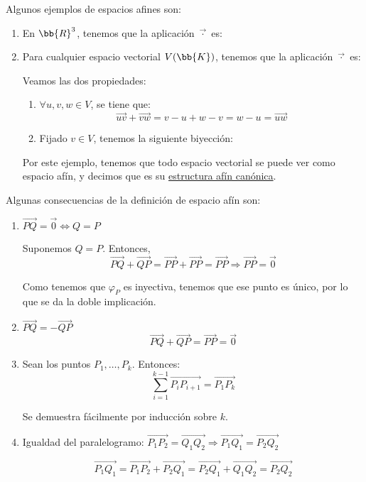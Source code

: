 \begin{ejemplo}
    Algunos ejemplos de espacios afines son:
    \begin{enumerate}
        \item En $\bb{R}^3$, tenemos que la aplicación $\vec{\cdot}$ es:

        \item Para cualquier espacio vectorial $V(\bb{K})$, tenemos que la aplicación $\vec{\cdot}$ es:

        Veamos las dos propiedades:
        \begin{enumerate}
            \item $\forall u,v,w\in V$, se tiene que:
            \begin{equation*}
                \vec{uv} + \vec{vw} = v-u+w-v = w-u = \vec{uw}
            \end{equation*}

            \item Fijado $v\in V$, tenemos la siguiente biyección:
        \end{enumerate}

        Por este ejemplo, tenemos que todo espacio vectorial se puede ver como espacio afín, y decimos que es su \ul{estructura afín canónica}.
    \end{enumerate}
\end{ejemplo}


Algunas consecuencias de la definición de espacio afín son:
\begin{enumerate}
    \item $\vec{PQ}=\vec{0}\Longleftrightarrow Q=P$
    
    Suponemos $Q=P$. Entonces,
        $$\vec{PQ}+\vec{QP}=\vec{PP}+\vec{PP}=\vec{PP}\Longrightarrow \vec{PP}=\vec{0}$$

    Como tenemos que $\varphi_P$ es inyectiva, tenemos que ese punto es único, por lo que se da la doble implicación.
    
    \item $\vec{PQ}=-\vec{QP}$
    $$\vec{PQ}+\vec{QP}=\vec{PP}=\vec{0}$$

    \item Sean los puntos $P_1,\dots, P_k$. Entonces:
    $$\sum_{i=1}^{k-1}\vec{P_iP_{i+1}}=\vec{P_1P_k}$$

    Se demuestra fácilmente por inducción sobre $k$.

    \item Igualdad del paralelogramo: $\vec{P_1P_2}=\vec{Q_1Q_2}\Longrightarrow \vec{P_1Q_1}=\vec{P_2Q_2}$

    $$\vec{P_1Q_1}=\vec{P_1P_2} + \vec{P_2Q_1} = \vec{P_2Q_1} + \vec{Q_1Q_2} = \vec{P_2Q_2}$$
\end{enumerate}

